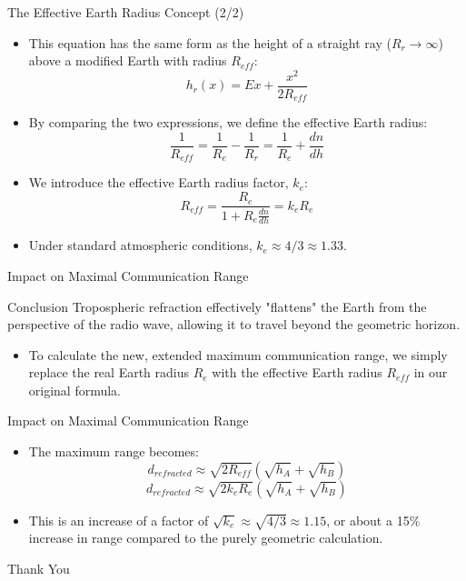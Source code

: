 \documentclass{beamer}
\begin{document}
	\begin{frame}{The Effective Earth Radius Concept (2/2)}
		\begin{itemize}
			\item This equation has the same form as the height of a straight ray ($R_r \to \infty$) above a modified Earth with radius $R_{eff}$:
			\[ h_r(x) = Ex + \frac{x^2}{2R_{eff}} \]
			\item By comparing the two expressions, we define the effective Earth radius:
			\[ \frac{1}{R_{eff}} = \frac{1}{R_e} - \frac{1}{R_r} = \frac{1}{R_e} + \frac{dn}{dh} \]
			\item We introduce the effective Earth radius factor, $k_e$:
			\[ R_{eff} = \frac{R_e}{1 + R_e \frac{dn}{dh}} = k_e R_e \]
			\vspace{-2.5em}
			\item Under standard atmospheric conditions, $k_e \approx 4/3 \approx 1.33$.
		\end{itemize}
	\end{frame}
	
	\begin{frame}{Impact on Maximal Communication Range}
		\begin{block}{Conclusion}
			Tropospheric refraction effectively "flattens" the Earth from the perspective of the radio wave, allowing it to travel beyond the geometric horizon.
		\end{block}
		\begin{itemize}
			\item To calculate the new, extended maximum communication range, we simply replace the real Earth radius $R_e$ with the effective Earth radius $R_{eff}$ in our original formula.
		
		\end{itemize}
	\end{frame}
	
	\begin{frame}{Impact on Maximal Communication Range}
		
		\begin{itemize}
			
			\item The maximum range becomes:
			\[ d_{refracted} \approx \sqrt{2 R_{eff}} (\sqrt{h_A} + \sqrt{h_B}) \]
			\[ d_{refracted} \approx \sqrt{2 k_e R_e} (\sqrt{h_A} + \sqrt{h_B}) \]
			\item This is an increase of a factor of $\sqrt{k_e} \approx \sqrt{4/3} \approx 1.15$, or about a 15\% increase in range compared to the purely geometric calculation.
		\end{itemize}
	\end{frame}
	
	\begin{frame}
		\centering
		\Huge Thank You
	\end{frame}
	
\end{document}
